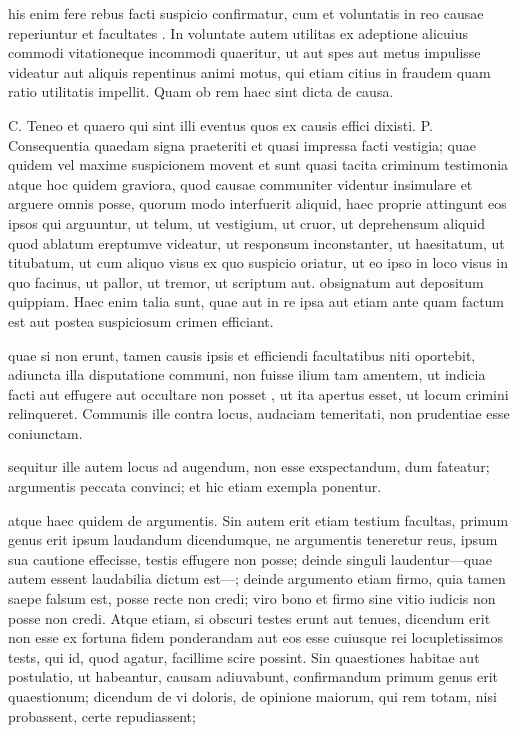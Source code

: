  his enim fere rebus facti suspicio confirmatur, cum et voluntatis in reo causae reperiuntur et facultates . In voluntate autem utilitas ex adeptione alicuius commodi vitationeque incommodi quaeritur, ut aut spes aut metus impulisse videatur aut aliquis repentinus animi motus, qui etiam citius in fraudem quam ratio utilitatis impellit. Quam ob rem haec sint dicta de causa.

 C. Teneo et quaero qui sint illi eventus quos ex causis effici dixisti. P. Consequentia quaedam signa praeteriti et quasi impressa facti vestigia; quae quidem vel maxime suspicionem movent et sunt quasi tacita criminum testimonia atque hoc quidem graviora, quod causae communiter videntur insimulare et arguere omnis posse, quorum modo interfuerit aliquid, haec proprie attingunt eos ipsos qui arguuntur, ut telum, ut vestigium, ut cruor, ut deprehensum aliquid quod ablatum ereptumve videatur, ut responsum inconstanter, ut haesitatum, ut titubatum, ut cum aliquo visus ex quo suspicio oriatur, ut eo ipso in loco visus in quo facinus, ut pallor, ut tremor, ut scriptum aut. obsignatum aut depositum quippiam. Haec enim talia sunt, quae aut in re ipsa aut etiam ante quam factum est aut postea suspiciosum crimen efficiant.

 quae si non erunt, tamen causis ipsis et efficiendi facultatibus niti oportebit, adiuncta illa disputatione communi, non fuisse ilium tam amentem, ut indicia facti aut effugere aut occultare non posset , ut ita apertus esset, ut locum crimini relinqueret. Communis ille contra locus, audaciam temeritati, non prudentiae esse coniunctam.

 sequitur ille autem locus ad augendum, non esse exspectandum, dum fateatur; argumentis peccata convinci; et hic etiam exempla ponentur.

 atque haec quidem de argumentis. Sin autem erit etiam testium facultas, primum genus erit ipsum laudandum dicendumque, ne argumentis teneretur reus, ipsum sua cautione effecisse, testis effugere non posse; deinde singuli laudentur—quae autem essent laudabilia dictum est—; deinde argumento etiam firmo, quia tamen saepe falsum est, posse recte non credi; viro bono et firmo sine vitio iudicis non posse non credi. Atque etiam, si obscuri testes erunt aut tenues, dicendum erit non esse ex fortuna fidem ponderandam aut eos esse cuiusque rei locupletissimos tests, qui id, quod agatur, facillime scire possint. Sin quaestiones habitae aut postulatio, ut habeantur, causam adiuvabunt, confirmandum primum genus erit quaestionum; dicendum de vi doloris, de opinione maiorum, qui rem totam, nisi probassent, certe repudiassent;

